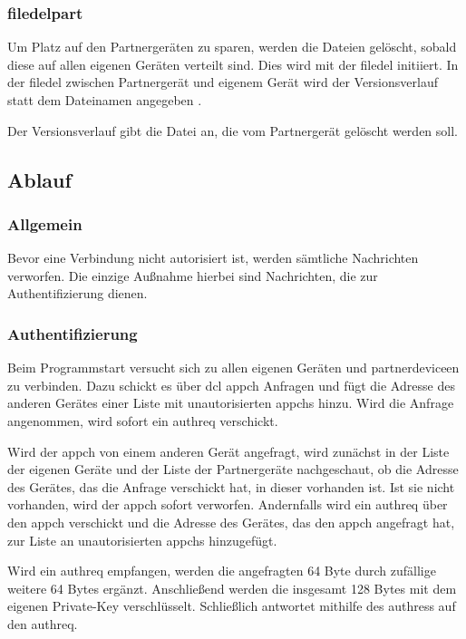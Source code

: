 \subsubsection{\gls*{filedelpart}}
Um Platz auf den Partnergeräten zu sparen, werden die Dateien gelöscht, sobald diese auf allen eigenen Geräten verteilt sind. Dies wird mit der \gls{filedel} initiiert. In der \gls{filedel} zwischen Partnergerät und eigenem Gerät wird der Versionsverlauf statt dem Dateinamen angegeben .
\sblitfiledelpartbytefield
\begin{description}
	Der Versionsverlauf gibt die Datei an, die vom Partnergerät gelöscht werden soll. 
\end{description}

\subsection{Ablauf}
\subsubsection{Allgemein}
Bevor eine Verbindung nicht autorisiert ist, werden sämtliche Nachrichten verworfen. Die einzige Außnahme hierbei sind Nachrichten, die zur Authentifizierung dienen. 

\subsubsection{Authentifizierung}
Beim Programmstart versucht sich \sblit zu allen eigenen Geräten und \gls{partnerdevice}en zu verbinden. Dazu schickt es über \gls{dcl} \gls{appch} Anfragen und fügt die Adresse des anderen Gerätes einer Liste mit unautorisierten \gls{appch}s hinzu. Wird die Anfrage angenommen, wird sofort ein \gls{authreq} verschickt. 

Wird der \gls{appch} von einem anderen Gerät angefragt, wird zunächst in der Liste der eigenen Geräte  und der Liste der Partnergeräte  nachgeschaut, ob die Adresse des Gerätes, das die Anfrage verschickt hat, in dieser vorhanden ist. Ist sie nicht vorhanden, wird der \gls{appch} sofort verworfen. Andernfalls wird ein \gls{authreq} über den \gls{appch} verschickt und die Adresse des Gerätes, das den \gls{appch} angefragt hat, zur Liste an unautorisierten \gls{appch}s hinzugefügt.

Wird ein \gls{authreq} empfangen, werden die angefragten 64 Byte durch zufällige weitere 64 Bytes ergänzt. Anschließend werden die insgesamt 128 Bytes mit dem eigenen Private-Key verschlüsselt. Schließlich antwortet \sblit mithilfe des \gls{authres}s auf den \gls{authreq}.


